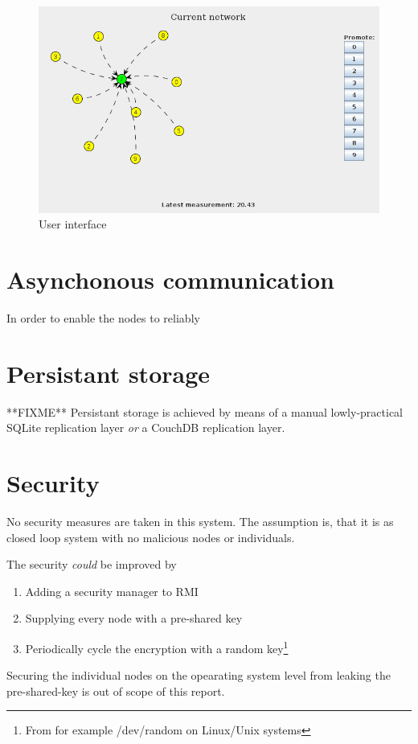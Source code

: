 \documentclass[10pt,a4paper]{article}
\begin{document}
\begin{figure}[h]
\centering
\includegraphics[scale=0.4]{fig/UI.png}
 \caption{User interface}
 \label{fig:ui}
\end{figure}



\section{Asynchonous communication}
In order to enable the nodes to reliably 

\section{Persistant storage}
**FIXME** Persistant storage is achieved by means of a manual lowly-practical SQLite replication layer \emph{or} a CouchDB replication layer.

\section{Security}
No security measures are taken in this system. The assumption is, that it is as closed loop system with no malicious nodes or individuals.

The security \emph{could} be improved by 
\begin{enumerate}
\item Adding a security manager to RMI
\item Supplying every node with a pre-shared key
\item Periodically cycle the encryption with a random key\footnote{From for example /dev/random on Linux/Unix systems}
\end{enumerate}
Securing the individual nodes on the opearating system level from leaking the pre-shared-key is out of scope of this report.
\end{document}
